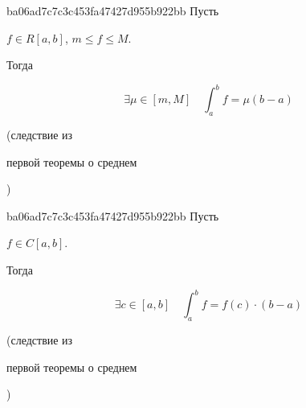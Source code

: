 \begin{note}{ba06ad7c7c3c453fa47427d955b922bb}
    Пусть \begin{icloze}{2}\({ f \in R[a, b] }\), \({ m \leqslant f \leqslant M }\).\end{icloze}
    Тогда
    \begin{icloze}{1}
        \[
            \exists \mu \in [m, M] \quad \int_{a}^{b} f = \mu(b - a)
        \]
    \end{icloze}

    \begin{center}
        \tiny
        (следствие из \begin{icloze}{3}первой теоремы о среднем\end{icloze})
    \end{center}
\end{note}

\begin{note}{ba06ad7c7c3c453fa47427d955b922bb}
    Пусть \begin{icloze}{2}\({ f \in C[a, b] }\).\end{icloze}
    Тогда
    \begin{icloze}{1}
        \[
            \exists c \in [a, b] \quad \int_{a}^{b} f = f(c) \cdot (b - a)
        \]
    \end{icloze}

    \begin{center}
        \tiny
        (следствие из \begin{icloze}{3}первой теоремы о среднем\end{icloze})
    \end{center}
\end{note}


